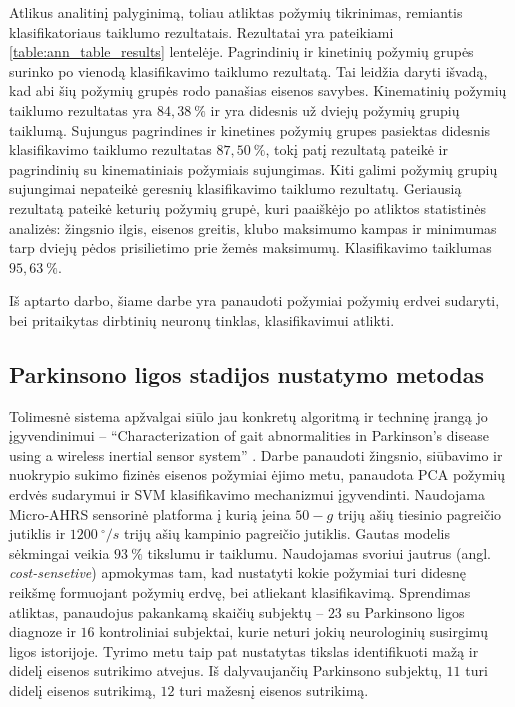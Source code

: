 \documentclass[]{vgtuef}
\begin{document}
Atlikus analitinį palyginimą, toliau atliktas požymių tikrinimas, remiantis klasifikatoriaus taiklumo rezultatais. Rezultatai yra pateikiami \ref{table:ann_table_results} lentelėje. Pagrindinių ir kinetinių požymių grupės surinko po vienodą klasifikavimo taiklumo rezultatą. Tai leidžia daryti išvadą, kad abi šių požymių grupės rodo panašias eisenos savybes. Kinematinių požymių taiklumo rezultatas yra $84,38~\%$ ir yra didesnis už dviejų požymių grupių taiklumą. Sujungus pagrindines ir kinetines požymių grupes pasiektas didesnis klasifikavimo taiklumo rezultatas $87,50~\%$, tokį patį rezultatą pateikė ir pagrindinių su kinematiniais požymiais sujungimas. Kiti galimi požymių grupių sujungimai nepateikė geresnių klasifikavimo taiklumo rezultatų. Geriausią rezultatą pateikė keturių požymių grupė, kuri paaiškėjo po atliktos statistinės analizės: žingsnio ilgis, eisenos greitis, klubo maksimumo kampas ir minimumas tarp dviejų pėdos prisilietimo prie žemės maksimumų. Klasifikavimo taiklumas $95,63~\%$.

Iš aptarto darbo, šiame darbe yra panaudoti požymiai požymių erdvei sudaryti, bei pritaikytas dirbtinių neuronų tinklas, klasifikavimui atlikti.

\subsection{Parkinsono ligos stadijos nustatymo metodas}


Tolimesnė sistema apžvalgai siūlo jau konkretų algoritmą ir techninę įrangą jo įgyvendinimui -- ``Characterization of gait abnormalities in Parkinson's disease using a wireless inertial sensor system'' \cite{5627904}. Darbe panaudoti žingsnio, siūbavimo ir nuokrypio sukimo fizinės eisenos požymiai ėjimo metu, panaudota PCA požymių erdvės sudarymui ir SVM klasifikavimo mechanizmui įgyvendinti. Naudojama Micro-AHRS sensorinė platforma į kurią įeina $50-g$ trijų ašių tiesinio pagreičio jutiklis ir $1200~^\circ/s$ trijų ašių kampinio pagreičio jutiklis. Gautas modelis sėkmingai veikia $93~\%$ tikslumu ir taiklumu. Naudojamas svoriui jautrus (angl. \textit{cost-sensetive}) apmokymas tam, kad nustatyti kokie požymiai turi didesnę reikšmę formuojant požymių erdvę, bei atliekant klasifikavimą. Sprendimas atliktas, panaudojus pakankamą skaičių subjektų -- $23$ su Parkinsono ligos diagnoze ir $16$ kontroliniai subjektai, kurie neturi jokių neurologinių susirgimų ligos istorijoje. Tyrimo metu taip pat nustatytas tikslas identifikuoti mažą ir didelį eisenos sutrikimo atvejus. Iš dalyvaujančių Parkinsono subjektų, $11$ turi didelį eisenos sutrikimą, $12$ turi mažesnį eisenos sutrikimą. 
\end{document}
